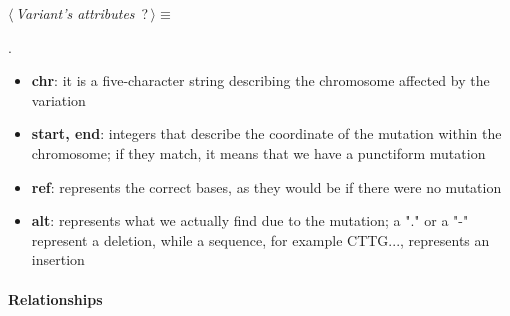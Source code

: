 	\begin{flushleft} \small
\begin{minipage}{\linewidth}\label{scrap2}\raggedright\small
{} $\langle\,${\itshape {Variant's attributes}}\nobreak\ {\footnotesize {?}}$\,\rangle\equiv$
\vspace{-1ex}
\begin{list}{}{} \item

                
        {\NWsep}
\end{list}
\vspace{-1.5ex}
\footnotesize
\begin{list}{}{\setlength{\itemsep}{-\parsep}\setlength{\itemindent}{-\leftmargin}}
\item {\NWtxtMacroNoRef}.

\item{}
\end{list}
\end{minipage}\vspace{4ex}
\end{flushleft}
\begin{itemize}
	\item \textbf{chr}: it is a five-character string describing the chromosome affected by the variation
 	\item \textbf{start, end}:  integers that describe the coordinate of the mutation within the chromosome; if they match, it means that we have a punctiform mutation
	\item \textbf{ref}: represents the correct bases, as they would be if there were no mutation
   	\item \textbf{alt}: represents what we actually find due to the mutation; a "." or a "-" represent a deletion, while a sequence, for example CTTG..., represents an insertion
\end{itemize}

\paragraph{Relationships}  

